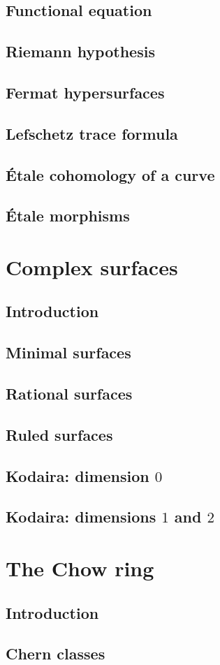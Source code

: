 \documentclass [11 pt, oneside, margin = 1 in] {article}
\begin{document}
\subsection{Functional equation}
\subsection{Riemann hypothesis}
\subsection{Fermat hypersurfaces}
\subsection{Lefschetz trace formula}
\subsection{\'Etale cohomology of a curve}
\subsection{\'Etale morphisms}

\section{Complex surfaces}
\subsection{Introduction}
\subsection{Minimal surfaces}
\subsection{Rational surfaces}
\subsection{Ruled surfaces}
\subsection{Kodaira: dimension $0$}
\subsection{Kodaira: dimensions $1$ and $2$}


\section{The Chow ring}
\subsection{Introduction}
\subsection{Chern classes}

\printindex
\end{document}

